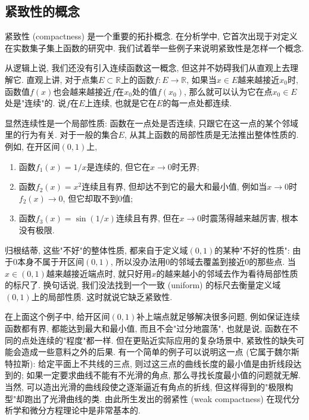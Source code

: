 

\subsection{紧致性的概念}
紧致性 (compactness) 是一个重要的拓扑概念. 在分析学中, 它首次出现于对定义在实数集子集上函数的研究中. 我们试着举一些例子来说明紧致性是怎样一个概念.

从逻辑上说, 我们还没有引入连续函数这一概念, 但这并不妨碍我们从直观上去理解它. 直观上讲, 对于点集$E\subset\mathbb{R}$上的函数$f:E\to\mathbb{R}$, 如果当$x\in E$越来越接近$x_0$时, 函数值$f(x)$也会越来越接近$f$在$x_0$处的值$f(x_0)$, 那么就可以认为它在点$x_0\in E$处是"连续"的. 说$f$在$E$上连续, 也就是它在$E$的每一点处都连续. 

显然连续性是一个局部性质: 函数在一点处是否连续, 只跟它在这一点的某个邻域里的行为有关. 对于一般的集合$E$, 从其上函数的局部性质是无法推出整体性质的. 例如, 在开区间$(0,1)$上,

\begin{enumerate}
\item 函数$f_1(x)=1/x$是连续的, 但它在$x\to0$时无界; 
\item 函数$f_2(x)=x^2$连续且有界, 但却达不到它的最大和最小值, 例如当$x\to0$时$f_2(x)\to0$, 但它却取不到$0$值; 
\item 函数$f_3(x)=\sin(1/x)$连续且有界, 但在$x\to0$时震荡得越来越厉害, 根本没有极限. 
\end{enumerate}

归根结蒂, 这些"不好"的整体性质, 都来自于定义域$(0,1)$的某种"不好的性质": 由于$0$本身不属于开区间$(0,1)$, 所以没办法用$0$的邻域去覆盖到接近$0$的那些点. 当$x\in(0,1)$越来越接近端点时, 就只好用$x$的越来越小的邻域去作为看待局部性质的标尺了. 换句话说, 我们没法找到一个一致 (uniform) 的标尺去衡量定义域$(0,1)$上的局部性质. 这时就说它缺乏紧致性. 

在上面这个例子中, 给开区间$(0,1)$补上端点就足够解决很多问题, 例如保证连续函数都有界, 都能达到最大和最小值, 而且不会"过分地震荡", 也就是说, 函数在不同的点处连续的"程度"都一样. 但在更贴近实际应用的复杂场景中, 紧致性的缺失可能会造成一些意料之外的后果. 有一个简单的例子可以说明这一点 (它属于魏尔斯特拉斯): 给定平面上不共线的三点, 则过这三点的曲线长度的最小值是由折线段达到的; 如果一定要求曲线不能有不光滑的角点, 那么寻找长度最小值的问题就无解. 当然, 可以造出光滑的曲线段使之逐渐逼近有角点的折线, 但这样得到的"极限构型"却跑出了光滑曲线的类. 由此所生发出的弱紧性 (weak compactness) 在现代分析学和微分方程理论中是非常基本的.

